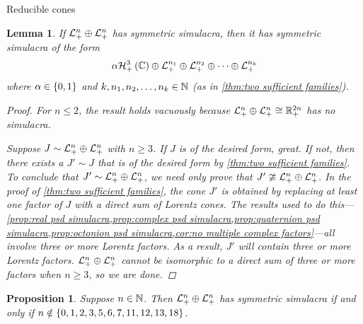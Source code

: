 \documentclass{interact}
\theoremstyle{plain}
\newtheorem{lemma}[theorem]{Lemma}
\newtheorem{proposition}[theorem]{Proposition}
\theoremstyle{definition}
\theoremstyle{remark}
\begin{document}
\begin{section}{Reducible cones}
    \begin{lemma}\label{lem:Ln-squared is easy to brute force}
      If ${\mathcal{L}^{{n}}_{+}}\oplus{ \mathcal{L}^{{n}}_{+} }$ has symmetric simulacra, then it has
      symmetric simulacra of the form
      \begin{equation*}
        \alpha \Hnplus[3]\of{\Cn[1]}
        \oplus
        \Lnplus[n_{1}]
        \oplus
        \Lnplus[n_{2}]
        \oplus
        \cdots
        \oplus
        \Lnplus[n_{k}]
      \end{equation*}
      where $\alpha \in \left\lbrace{0,1}\right\rbrace$ and $k, n_{1}, n_{2}, \ldots, n_{k}
      \in \Nn[1]$ (as in \cref{thm:two sufficient families}).

      \begin{proof}
        For $n \le 2$, the result holds vacuously because
        $\directsum{\Lnplus[n]}{\Lnplus[n]} \cong \Rnplus[2n]$ has no
        simulacra.

        Suppose $J \sim { \mathcal{L}^{{n}}_{+} }\oplus{ \mathcal{L}^{{n}}_{+} }$ with $n \ge
        3$. If $J$ is of the desired form, great. If not, then there
        exists a $J' \sim J$ that is of the desired form by
        \cref{thm:two sufficient families}. To conclude that $J' \sim
        { \mathcal{L}^{{n}}_{+} }\oplus{ \mathcal{L}^{{n}}_{+} }$, we need only prove that $J'
        \ncong { \mathcal{L}^{{n}}_{+} }\oplus{ \mathcal{L}^{{n}}_{+} }$. In the proof of
        \cref{thm:two sufficient families}, the cone $J'$ is obtained
        by replacing at least one factor of $J$ with a direct sum of
        Lorentz cones. The results used to do this---\cref{prop:real
          psd simulacra,prop:complex psd simulacra,prop:quaternion psd
          simulacra,prop:octonion psd simulacra,cor:no multiple
          complex factors}---all involve three or more Lorentz
        factors. As a result, $J'$ will contain three or more Lorentz
        factors. ${\mathcal{L}^{{n}}_{+}}\oplus{ \mathcal{L}^{{n}}_{+} }$ cannot be isomorphic
        to a direct sum of three or more factors when $n \ge 3$, so we
        are done.
      \end{proof}
    \end{lemma}

    \begin{proposition}
      Suppose $n \in \Nn[1]$. Then ${\mathcal{L}^{{n}}_{+}}\oplus{ \mathcal{L}^{{n}}_{+} }$ has
      symmetric simulacra if and only if $n \notin
      \left\lbrace{0,1,2,3,5,6,7,11,12,13,18}\right\rbrace$.


\end{proposition}
\end{section}
\end{document}
